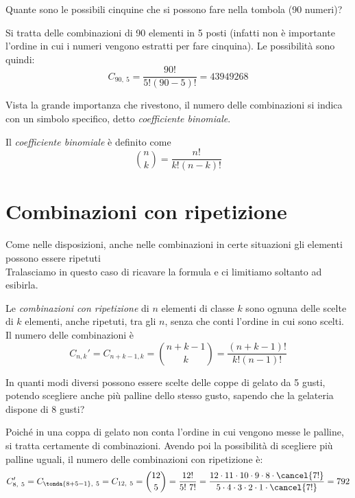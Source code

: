 \begin{esempio}
Quante sono le possibili cinquine che si possono fare nella tombola (90 numeri)?

Si tratta delle combinazioni di 90 elementi in 5 posti (infatti non è 
importante l'ordine in cui i numeri vengono estratti per fare cinquina). Le 
possibilità sono quindi:
\[C_{90,~5} =  \dfrac{90!}{5!(90-5)!}=43 949 268\]
\end{esempio}

Vista la grande importanza che rivestono, il numero delle combinazioni si 
indica con un simbolo specifico, detto \emph{coefficiente binomiale}.

\begin{newdef}{}{}
Il \emph{coefficiente binomiale} è definito come 
\[\binom{n}{k}=\dfrac{n!}{k!(n-k)!}\]
\end{newdef}

\section{Combinazioni con ripetizione}
\label{sec:calc_combinatoio_combinazioni_con_ripetizione}

Come nelle disposizioni, anche nelle combinazioni in certe situazioni gli 
elementi possono essere ripetuti \\[4pt]
Tralasciamo in questo caso di ricavare la formula e ci limitiamo soltanto 
ad esibirla.

\begin{newdef}{}{}
Le \emph{combinazioni con ripetizione} di \(n\) elementi di classe \(k\) 
sono ognuna delle scelte di \(k\) elementi, anche ripetuti, tra gli \(n\), 
senza che conti l'ordine in cui sono scelti. 
Il numero delle combinazioni è
\[C_{n,k}' =  C_{n+k-1,k} = \binom{n+k-1}{k} = \dfrac{(n+k-1)!}{k!(n-1)!}\]
\end{newdef}

\begin{esempio}
In quanti modi diversi possono essere scelte delle coppe di gelato da 5 
gusti, potendo scegliere anche più palline dello stesso gusto, sapendo che 
la gelateria dispone di 8 gusti?

Poiché in una coppa di gelato non conta l'ordine in cui vengono messe le 
palline, si tratta certamente di combinazioni. 
Avendo poi la possibilità di scegliere più palline uguali, 
il numero delle combinazioni con ripetizione è:
\[C_{8,~5}' = C_{\tonda{8+5-1},~5} = C_{12,~5} = \binom{12}{5} = 
\frac{12!}{5!~7!} =
\frac{12 \cdot 11 \cdot 10 \cdot 9 \cdot 8 \cdot \cancel{7!}}{5 \cdot 4 \cdot 
3\cdot 2\cdot 1 \cdot \cancel{7!}}=792\]
\end{esempio}

